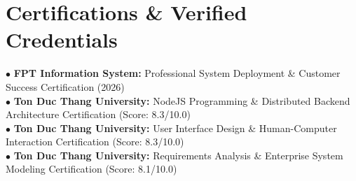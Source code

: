 \documentclass[letterpaper,10pt]{article}
\begin{document}
\section{Certifications \& Verified Credentials}
 \begin{itemize}[leftmargin=0.15in, label={}]
    \small{\item{
     $\bullet$ \textbf{FPT Information System:} Professional System Deployment \& Customer Success Certification (2026) \\
     $\bullet$ \textbf{Ton Duc Thang University:} NodeJS Programming \& Distributed Backend Architecture Certification (Score: 8.3/10.0) \\
     $\bullet$ \textbf{Ton Duc Thang University:} User Interface Design \& Human-Computer Interaction Certification (Score: 8.3/10.0) \\
     $\bullet$ \textbf{Ton Duc Thang University:} Requirements Analysis \& Enterprise System Modeling Certification (Score: 8.1/10.0)
    }}
 \end{itemize}
\end{document}
